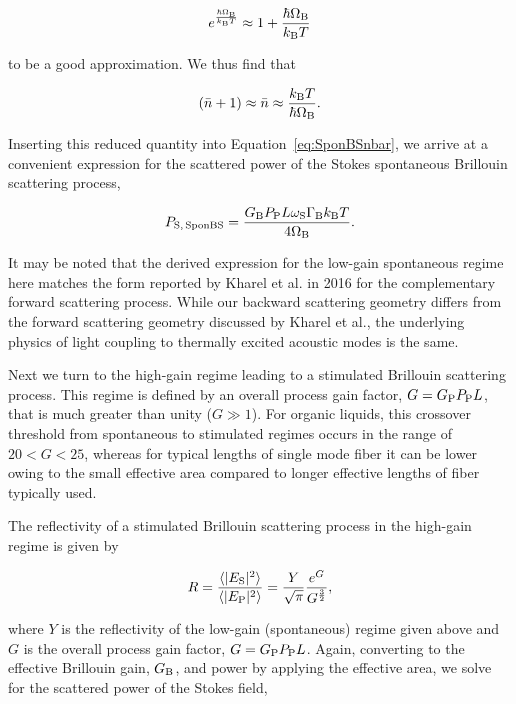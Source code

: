 \begin{equation}
e^{\frac{\hbar\Omega_{\rm B}}{k_{\rm B}T}} \approx 1 + \frac{\hbar\Omega_{\rm B}}{k_{\rm B}T}
\end{equation}

to be a good approximation. We thus find that

\begin{equation}
(\bar{n} + 1) \approx \bar{n} \approx \frac{k_{\rm B}T}{\hbar\Omega_{\rm B}}.
\end{equation}

Inserting this reduced quantity into Equation~\ref{eq:SponBSnbar}, we arrive at a convenient expression for the scattered power of the Stokes spontaneous Brillouin scattering process,

\begin{equation}
  P_{\rm S,\,SponBS} = \frac{G_{\rm B}P_{\rm P}L\omega_{\rm S}\Gamma_{\rm B}k_{\rm B}T}{4\Omega_{\rm B}}.
  \label{eq:sponBSscatteredPower}
\end{equation}

It may be noted that the derived expression for the low-gain spontaneous regime here matches the form reported by Kharel et al. in 2016 \cite{kharel2016noise} for the complementary forward scattering process. While our backward scattering geometry differs from the forward scattering geometry discussed by Kharel et al., the underlying physics of light coupling to thermally excited acoustic modes is the same.

Next we turn to the high-gain regime leading to a stimulated Brillouin scattering process. This regime is defined by an overall process gain factor, \(G = G_{\rm P}P_{\rm P}L\), that is much greater than unity (\(G \gg 1\)). For organic liquids, this crossover threshold from spontaneous to stimulated regimes occurs in the range of \(20 < G < 25\), \cite{boyd1990noise} whereas for typical lengths of single mode fiber it can be lower \cite{ippen1972stimulated} owing to the small effective area compared to longer effective lengths of fiber typically used.

The reflectivity of a stimulated Brillouin scattering process in the high-gain regime is given by \cite{boyd1990noise}

\begin{equation}
  R = \frac{\langle|E_{\rm S}|^{2}\rangle}{\langle|E_{\rm P}|^{2}\rangle} = \frac{Y}{\sqrt{\pi}}\frac{e^{G}}{G^{\frac{3}{2}}},
\end{equation}

where \(Y\) is the reflectivity of the low-gain (spontaneous) regime given above and \(G\) is the overall process gain factor, \(G = G_{\rm P}P_{\rm P}L\). Again, converting to the effective Brillouin gain, \(G_{\rm B}\), and power by applying the effective area, we solve for the scattered power of the Stokes field,

